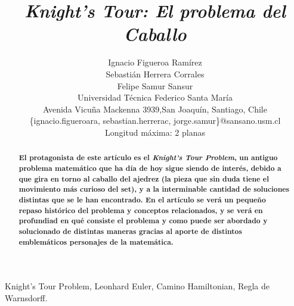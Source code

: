 \documentclass[journal, 10pt]{IEEEtran}
\begin{document}
\title{\textit{Knight's Tour:  El problema del Caballo}}
\author{Ignacio Figueroa Ram\'irez \\Sebasti\'an Herrera Corrales\\ Felipe Samur Sansur\\ Universidad T\'ecnica Federico Santa Mar\'ia \\ Avenida Vicu\~na Mackenna 3939,San Joaqu\'in, Santiago, Chile \\
\{ignacio.figueroara, sebastian.herrerac, jorge.samur\}@sansano.usm.cl\\
Longitud máxima: 2 planas}
\maketitle

\begin{abstract}
\textbf{El protagonista de este artículo es el \textit{Knight's Tour Problem}, un antiguo problema matemático que ha día de hoy sigue siendo de interés, debido a que gira en torno al caballo del ajedrez (la pieza que sin duda tiene el movimiento más curioso del set), y a la interminable cantidad de soluciones distintas que se le han encontrado. En el artículo se verá un pequeño repaso histórico del problema y conceptos relacionados, y se verá en profundiad en qué consiste el problema y como puede ser abordado y solucionado de distintas maneras gracias al aporte de distintos emblemáticos personajes de la matemática. }
\end{abstract}

\begin{IEEEkeywords}
Knight's Tour Problem, Leonhard Euler, Camino Hamiltonian, Regla de Warnsdorff.
\end{IEEEkeywords}
\end{document}
